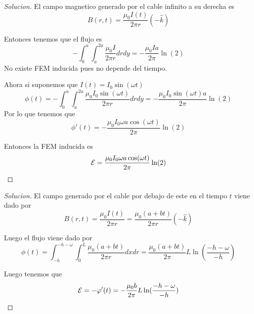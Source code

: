\documentclass{article}
\theoremstyle{definition}
\newenvironment{solution}{\begin{proof}[Solucion]}{\end{proof}}
\begin{document}
\begin{solution}
  El campo magnetico generado por el cable infinito a su derecha es
  \begin{equation*}
    B(r, t) = \frac{\mu_{0}I(t)}{2\pi r} (-\hat{k})
  \end{equation*}

  Entonces tenemos que el flujo es
  \begin{equation*}
    -\int_{0}^{a}\int_{a}^{2a} \frac{\mu_{0}I}{2\pi r} dr dy = -\frac{\mu_{0} I a}{2\pi} \ln(2)
  \end{equation*}
  No existe FEM inducida pues no depende del tiempo.

  Ahora si suponemos que $I(t) = I_{0}\sin(\omega t)$
  \begin{equation*}
    \phi(t) = -\int_{0}^{a}\int_{a}^{2a} \frac{\mu_{0}I_{0} \sin(\omega t)}{2\pi r} dr dy = -\frac{\mu_{0} I_{0} \sin(\omega t) a}{2\pi} \ln(2)
  \end{equation*}
  Por lo que tenemos que
  \begin{equation*}
    \phi'(t) = -\frac{\mu_{0} I_{0} \omega a \cos(\omega t)}{2\pi} \ln(2)
  \end{equation*}

  Entonces la FEM inducida es
  \begin{equation*}
    \mathcal{E} = \frac{\mu_{0} I_{0} \omega a \cos(\omega t)}{2\pi} \ln(2)
  \end{equation*}
\end{solution}
\begin{solution}
  El campo generado por el cable por debajo de este en el tiempo $t$ viene dado por
  \begin{equation*}
    B(r, t) = \frac{\mu_{0}I(t)}{2\pi r} = \frac{\mu_{0} (a + bt)}{2\pi r} (-\hat{k})
  \end{equation*}

  Luego el flujo viene dado por
  \begin{equation*}
    \phi(t) = \int_{-h}^{-h - \omega}\int_{0}^{L} \frac{\mu_{0} (a + bt)}{2\pi r} dx dr = \frac{\mu_{0} (a + bt)}{2\pi} L \ln(\frac{-h - \omega}{-h})
  \end{equation*}

  Luego tenemos que
  \begin{equation*}
    \mathcal{E} = -\varphi'(t) = - \frac{\mu_{0} b}{2\pi} L \ln(\frac{-h - \omega}{-h})
  \end{equation*}
\end{solution}
\end{document}
